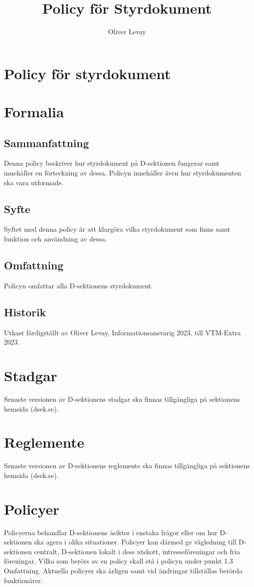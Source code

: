 \documentclass[]{dsekprotokoll}
\title{Policy för Styrdokument}
\author{Oliver Levay}
\begin{document}
\section*{Policy för styrdokument}
\section{Formalia}
\subsection{Sammanfattning}
Denna policy beskriver hur styrdokument på D-sektionen fungerar samt innehåller en förteckning av dessa. Policyn innehåller även hur styrdokumenten ska vara utformade.
\subsection{Syfte}
Syftet med denna policy är att klargöra vilka styrdokument som finns samt funktion och användning av dessa.
\subsection{Omfattning}
Policyn omfattar alla D-sektionens styrdokument.

\subsection{Historik}
Utkast färdigställt av Oliver Levay, Informationsansvarig 2023, till VTM-Extra 2023.
\section{Stadgar}
Senaste versionen av D-sektionens stadgar ska finnas tillgängliga på sektionens hemsida (dsek.se).

\section{Reglemente}
Senaste versionen av D-sektionens reglemente ska finnas tillgängliga på sektionens hemsida (dsek.se).

\section{Policyer}
Policyerna behandlar D-sektionens åsikter i enstaka frågor eller om hur D-sektionen ska agera i olika situationer. Policyer kan därmed ge vägledning till D-sektionen centralt, D-sektionen lokalt i dess
utskott, intresseföreningar och fria föreningar. Vilka som berörs av en policy skall stå i policyn under punkt 1.3 Omfattning. Aktuella policyer ska årligen samt vid ändringar tillställas berörda funktionärer.
\end{document}
